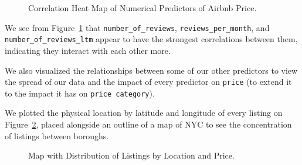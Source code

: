 \documentclass[
  letterpaper,
  DIV=11,
  numbers=noendperiod]{scrartcl}
\begin{document}
\begin{figure}[H]


\caption{\label{fig-corr-plot}Correlation Heat Map of Numerical
Predictors of Airbnb Price.}

\end{figure}%

We see from Figure~\ref{fig-corr-plot} that
\texttt{number\_of\_reviews}, \texttt{reviews\_per\_month}, and
\texttt{number\_of\_reviews\_ltm} appear to have the strongest
correlations between them, indicating they interact with each other
more.

We also visualized the relationships between some of our other
predictors to view the spread of our data and the impact of every
predictor on \texttt{price} (to extend it to the impact it has on
\texttt{price\ category}).

We plotted the physical location by latitude and longitude of every
listing on Figure~\ref{fig-location-plot}, placed alongside an outline
of a map of NYC to see the concentration of listings between boroughs.

\begin{figure}[H]


\caption{\label{fig-location-plot}Map with Distribution of Listings by
Location and Price.}

\end{figure}%
\end{document}
